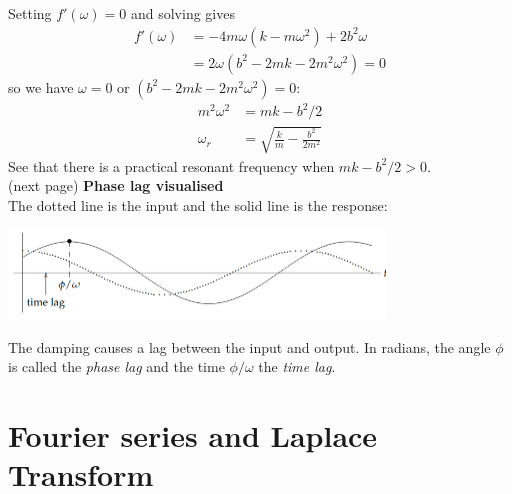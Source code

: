\documentclass{report}
\begin{document}
Setting $f'(\omega)=0$ and solving gives
\begin{align*}
f'(\omega)&=-4m\omega(k-m\omega^2)+2b^2\omega\\
&=2\omega(b^2-2mk-2m^2\omega^2)=0
\end{align*}
so we have $\omega=0$ or $(b^2-2mk-2m^2\omega^2)=0$:
\begin{align*}
m^2\omega^2&=mk-b^2/2\\
\omega_r&=\sqrt{\frac{k}{m}-\frac{b^2}{2m^2}}
\end{align*}
See that there is a practical resonant frequency when $mk-b^2/2>0$.\\
(next page)
\newpage
\noindent\textbf{Phase lag visualised}\\
The dotted line is the input and the solid line is the response:
\begin{center}
\includegraphics[width=10cm]{35}\\
\end{center}
The damping causes a lag between the input and output. In radians, the angle $\phi$ is called the
\textit{phase lag} and the time $\phi/\omega$ the \textit{time lag}.
\newpage

\section{Fourier series and Laplace Transform}
\end{document}
